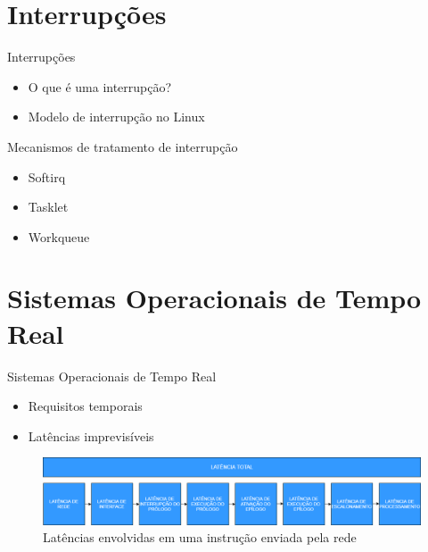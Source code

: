 \documentclass[12pt,brazil]{beamer}
\begin{document}
\section{Interrupções}
\begin{frame}{Interrupções}
    \begin{itemize}
    \item O que é uma interrupção?
    \item Modelo de interrupção no Linux
\end{itemize}
\end{frame}

\begin{frame}{Mecanismos de tratamento de interrupção}
    \begin{itemize}
    \item Softirq
    \item Tasklet
    \item Workqueue
\end{itemize}
\end{frame}

\section{Sistemas Operacionais de Tempo Real}
\begin{frame}{Sistemas Operacionais de Tempo Real}
    \begin{itemize}
        \item Requisitos temporais
        \item Latências imprevisíveis
    \end{itemize}
    \begin{figure}[!htb]
        \centering
        \includegraphics[width=\textwidth]{figures/latencias.png}
        \caption*{Latências envolvidas em uma instrução enviada pela rede}
    \end{figure}
\end{frame}
\end{document}

